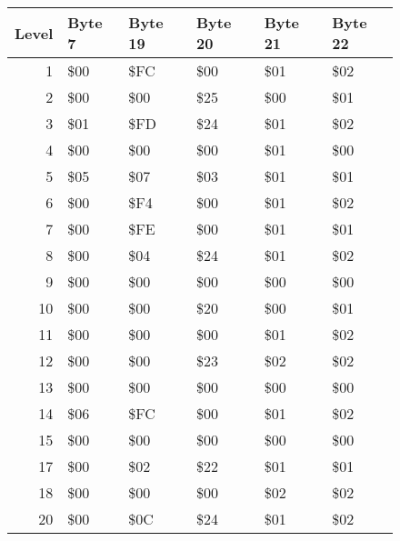 \begin{figure}[H]
  {
    \setlength{\tabcolsep}{3.0pt}
    \setlength\cmidrulewidth{\heavyrulewidth} %
    \begin{adjustbox}{width=\textwidth}

      \begin{tabular}{rlllll}
        \toprule
        Level & Byte 7    & Byte 19   & Byte 20   & Byte 21   & Byte 22   \\
        \midrule
        1 & \$00       & \$FC       & \$00       & \$01       & \$02       \\
        2 & \$00       & \$00       & \$25       & \$00       & \$01       \\
        3 & \$01       & \$FD       & \$24       & \$01       & \$02       \\
        4 & \$00       & \$00       & \$00       & \$01       & \$00       \\
        5 & \$05       & \$07       & \$03       & \$01       & \$01       \\
        6 & \$00       & \$F4       & \$00       & \$01       & \$02       \\
        7 & \$00       & \$FE       & \$00       & \$01       & \$01       \\
        8 & \$00       & \$04       & \$24       & \$01       & \$02       \\
        9 & \$00       & \$00       & \$00       & \$00       & \$00       \\
        10 & \$00       & \$00       & \$20       & \$00       & \$01       \\
        11 & \$00       & \$00       & \$00       & \$01       & \$02       \\
        12 & \$00       & \$00       & \$23       & \$02       & \$02       \\
        13 & \$00       & \$00       & \$00       & \$00       & \$00       \\
        14 & \$06       & \$FC       & \$00       & \$01       & \$02       \\
        15 & \$00       & \$00       & \$00       & \$00       & \$00       \\
        17 & \$00       & \$02       & \$22       & \$01       & \$01       \\
        18 & \$00       & \$00       & \$00       & \$02       & \$02       \\
        20 & \$00       & \$0C       & \$24       & \$01       & \$02       \\

\end{tabular}
\end{adjustbox}}
\end{figure}
